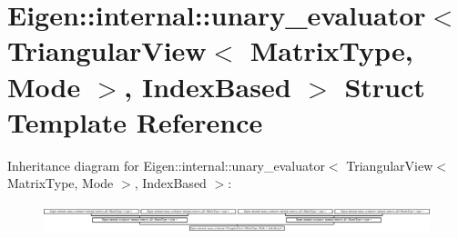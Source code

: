 \hypertarget{struct_eigen_1_1internal_1_1unary__evaluator_3_01_triangular_view_3_01_matrix_type_00_01_mode_01_4_00_01_index_based_01_4}{}\section{Eigen\+:\+:internal\+:\+:unary\+\_\+evaluator$<$ Triangular\+View$<$ Matrix\+Type, Mode $>$, Index\+Based $>$ Struct Template Reference}
\label{struct_eigen_1_1internal_1_1unary__evaluator_3_01_triangular_view_3_01_matrix_type_00_01_mode_01_4_00_01_index_based_01_4}
Inheritance diagram for Eigen\+:\+:internal\+:\+:unary\+\_\+evaluator$<$ Triangular\+View$<$ Matrix\+Type, Mode $>$, Index\+Based $>$\+:\begin{figure}[H]
\begin{center}
\leavevmode
\includegraphics[height=0.821918cm]{struct_eigen_1_1internal_1_1unary__evaluator_3_01_triangular_view_3_01_matrix_type_00_01_mode_01_4_00_01_index_based_01_4}
\end{center}
\end{figure}
